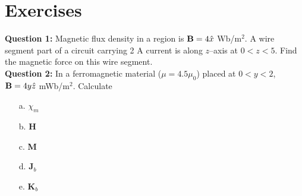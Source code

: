 \documentclass[12pt,a4paper]{article}
\begin{document}
\section{Exercises}
\noindent\textbf{Question 1:} Magnetic flux density in a region is $\mathrm{\textbf B}=4\hat x$ Wb/m$^2$. A wire segment part of a circuit carrying 2 A current is along $z$--axis at $0<z<5$. Find the magnetic force on this wire segment.\\[0.2cm]
\noindent\textbf{Question 2:} In a ferromagnetic material ($\mu=4.5\mu_0$) placed at $0<y<2$, $\mathrm{\textbf B}=4y\hat z$ mWb/m$^2$. Calculate
\begin{itemize}
\item[a.] $\chi_m$
\item[b.] \textbf{H}
\item[c.] \textbf{M}
\item[d.] \textbf{J}$_b$
\item[e.] \textbf{K}$_b$
\end{itemize}


\end{document}
